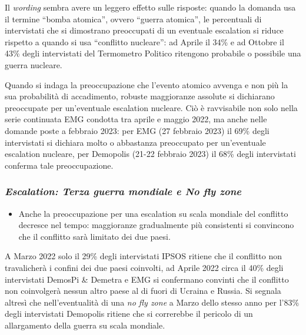 \documentclass[
]{book}
\providecommand{\tightlist}{%
  \setlength{\itemsep}{0pt}\setlength{\parskip}{0pt}}
\begin{document}
Il \emph{wording} sembra avere un leggero effetto sulle risposte: quando la domanda usa il termine ``bomba atomica'', ovvero ``guerra atomica'', le percentuali di intervistati che si dimostrano preoccupati di un eventuale escalation si riduce rispetto a quando si usa ``conflitto nucleare'': ad Aprile il 34\% e ad Ottobre il 43\% degli intervistati del Termometro Politico ritengono probabile o possibile una guerra nucleare.

Quando si indaga la preoccupazione che l'evento atomico avvenga e non più la sua probabilità di accadimento, robuste maggioranze assolute si dichiarano preoccupate per un'eventuale escalation nucleare. Ciò è ravvisabile non solo nella serie continuata EMG condotta tra aprile e maggio 2022, ma anche nelle domande poste a febbraio 2023: per EMG (27 febbraio 2023) il 69\% degli intervistati si dichiara molto o abbastanza preoccupato per un'eventuale escalation nucleare, per Demopolis (21-22 febbraio 2023) il 68\% degli intervistati conferma tale preoccupazione.

\hypertarget{escalation-terza-guerra-mondiale-e-no-fly-zone}{%
\subsubsection{\texorpdfstring{\emph{Escalation: Terza guerra mondiale e No fly zone}}{Escalation: Terza guerra mondiale e No fly zone}}\label{escalation-terza-guerra-mondiale-e-no-fly-zone}}

\begin{itemize}
\tightlist
\item
  Anche la preoccupazione per una escalation su scala mondiale del conflitto decresce nel tempo: maggioranze gradualmente più consistenti si convincono che il conflitto sarà limitato dei due paesi.
\end{itemize}

A Marzo 2022 solo il 29\% degli intervistati IPSOS ritiene che il conflitto non travalicherà i confini dei due paesi coinvolti, ad Aprile 2022 circa il 40\% degli intervistati DemosPi \& Demetra e EMG si confermano convinti che il conflitto non coinvolgerà nessun altro paese al di fuori di Ucraina e Russia. Si segnala altresì che nell'eventualità di una \emph{no fly zone} a Marzo dello stesso anno per l'83\% degli intervistati Demopolis ritiene che si correrebbe il pericolo di un allargamento della guerra su scala mondiale.
\end{document}

